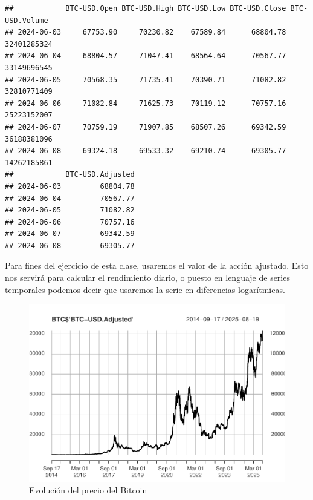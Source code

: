 \documentclass[
]{book}
\newenvironment{Shaded}{\begin{snugshade}}{\end{snugshade}}
\newcommand{\AttributeTok}[1]{\textcolor[rgb]{0.13,0.29,0.53}{#1}}
\newcommand{\FunctionTok}[1]{\textcolor[rgb]{0.13,0.29,0.53}{\textbf{#1}}}
\newcommand{\NormalTok}[1]{#1}
\newcommand{\SpecialCharTok}[1]{\textcolor[rgb]{0.81,0.36,0.00}{\textbf{#1}}}
\newcommand{\StringTok}[1]{\textcolor[rgb]{0.31,0.60,0.02}{#1}}
\begin{document}
\begin{verbatim}
##            BTC-USD.Open BTC-USD.High BTC-USD.Low BTC-USD.Close BTC-USD.Volume
## 2024-06-03     67753.90     70230.82    67589.84      68804.78    32401285324
## 2024-06-04     68804.57     71047.41    68564.64      70567.77    33149696545
## 2024-06-05     70568.35     71735.41    70390.71      71082.82    32810771409
## 2024-06-06     71082.84     71625.73    70119.12      70757.16    25223152007
## 2024-06-07     70759.19     71907.85    68507.26      69342.59    36188381096
## 2024-06-08     69324.18     69533.32    69210.74      69305.77    14262185861
##            BTC-USD.Adjusted
## 2024-06-03         68804.78
## 2024-06-04         70567.77
## 2024-06-05         71082.82
## 2024-06-06         70757.16
## 2024-06-07         69342.59
## 2024-06-08         69305.77
\end{verbatim}

Para fines del ejercicio de esta clase, usaremos el valor de la acción ajustado. Esto nos servirá para calcular el rendimiento diario, o puesto en lenguaje de series temporales podemos decir que usaremos la serie en diferencias logarítmicas.

\begin{Shaded}
\end{Shaded}

\begin{figure}

{\centering \includegraphics{Notas-Series-Tiempo_files/figure-latex/fig101-1} 

}

\caption{Evolución del precio del Bitcoin}\label{fig:fig101}
\end{figure}
\end{document}
